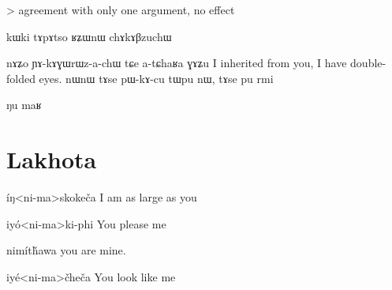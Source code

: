 \documentclass[oldfontcommands,oneside,a4paper,11pt]{article}
\newcommand{\ipa}[1]{{\phon #1}} %
\begin{document}

> agreement with only one argument, no effect 


 kɯki tɤpɤtso ʁʑɯnɯ chɤkɤβzuchɯ
 
 
  nɤʑo ɲɤ-kɤɣɯrɯz-a-chɯ tɕe a-tɕhaʁa ɣɤʑu
 I inherited from you, I have double-folded eyes.
nɯnɯ tɤse pɯ-kɤ-cu tɯpu nɯ, tɤse pu rmi

ŋu maʁ


\section{Lakhota}
íŋ<ni-ma>skokeča 
I am as large as you

iyó<ni-ma>ki-phi
You please me

nimítȟawa you are mine.

iyé<ni-ma>čheča You look like me
\citet[707]{ullrich08}

\citet[77]{deloria41}



\end{document}
